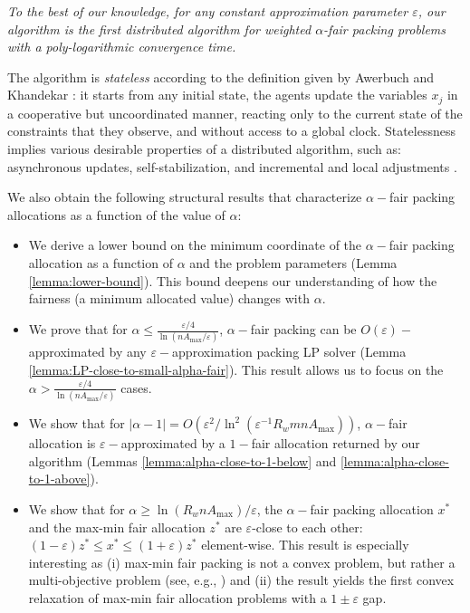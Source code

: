 \documentclass[11pt]{article}
\newcommand{\wratio}{R_w}
\begin{document}
\emph{To the best of our knowledge, for any constant approximation parameter $\varepsilon$, our algorithm is the first distributed algorithm for weighted $\alpha$-fair packing problems with a poly-logarithmic convergence time.} 

The algorithm is \emph{stateless} according to the definition given by  Awerbuch and Khandekar \cite{AwerbuchKhandekar2009, awerbuch2007greedy}: it starts from any initial state, the agents update the variables $x_j$ in a cooperative but uncoordinated manner, reacting only to the current state of the constraints that they observe, and without access to a global clock. Statelessness implies various desirable properties of a distributed algorithm, such as: asynchronous updates, self-stabilization, and incremental and local adjustments \cite{AwerbuchKhandekar2009, awerbuch2007greedy}.  

We also obtain the following structural results that characterize $\alpha-$fair packing allocations as a function of the value of 
$\alpha$: 
\begin{itemize}[topsep=5pt, leftmargin=10pt]
\itemsep0em 
\item We derive a lower bound on the minimum coordinate of the $\alpha-$fair packing allocation as a function of $\alpha$ and the problem parameters (Lemma \ref{lemma:lower-bound}). This bound deepens our understanding of how the fairness (a minimum allocated value) changes with $\alpha$. \item We prove that for $\alpha \leq \frac{\varepsilon/4}{\ln(nA_{\max}/\varepsilon)}$, $\alpha-$fair packing can be $O(\varepsilon)-$approximated by any $\varepsilon-$approximation packing LP solver (Lemma \ref{lemma:LP-close-to-small-alpha-fair}). This result allows us to focus on the $\alpha > \frac{\varepsilon/4}{\ln(nA_{\max}/\varepsilon)}$ cases.
\item We show that for $|\alpha-1| = O({\varepsilon^2}/{\ln^2(\varepsilon^{-1}\wratio mnA_{\max})})$, $\alpha-$fair allocation is $\varepsilon-$approximated by a $1-$fair allocation returned by our algorithm (Lemmas \ref{lemma:alpha-close-to-1-below} and \ref{lemma:alpha-close-to-1-above}).
\item We show that for $\alpha \geq \ln(\wratio n A_{\max})/\varepsilon$, the $\alpha-$fair packing allocation $x^*$ and the max-min fair allocation $z^*$ are $\varepsilon$-close to each other: $(1-\varepsilon)z^*\leq x^* \leq (1+\varepsilon)z^*$ element-wise. This result is especially interesting as {(i)} max-min fair packing is not a convex problem, but rather a multi-objective problem 
(see, e.g., \cite{kleinberg1999fairness, radunovic2007unified}) {and (ii) the result yields the first convex relaxation of max-min fair allocation problems with a $1\pm \varepsilon$ gap}.
\end{itemize}
\end{document}
